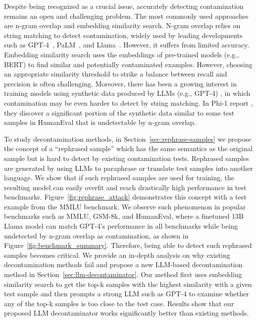 Despite being recognized as a crucial issue, accurately detecting contamination remains an open and challenging problem.
The most commonly used approaches are n-gram overlap and embedding similarity search.
N-gram overlap relies on string matching to detect contamination, widely used by leading developments such as GPT-4~\citep{openai2023gpt4}, PaLM~\citep{anil2023palm}, and Llama~\citep{touvron2023llama}. However, it suffers from limited accuracy.
Embedding similarity search uses the embeddings of pre-trained models (e.g., BERT) to find similar and potentially contaminated examples.
However, choosing an appropriate similarity threshold to strike a balance between recall and precision is often challenging.
Moreover, there has been a growing interest in training models using synthetic data produced by LLMs (e.g., GPT-4) \citep{gunasekar2023textbooks, alpaca, wang2023selfinstruct, xu2023wizardlm, mukherjee2023orca}, in which contamination may be even harder to detect by string matching.
In Phi-1 report \citep{gunasekar2023textbooks}, they discover a significant portion of the synthetic data similar to some test samples in HumanEval that is undetectable by n-gram overlap.

To study decontamination methods, in Section~\ref{sec:rephrase-samples} we propose the concept of a ``rephrased sample'' which has the same semantics as the original sample but is hard to detect by existing contamination tests.
Rephrased samples are generated by using LLMs to paraphrase or translate test samples into another language.
We show that if such rephrased samples are used for training, the resulting model can easily overfit and reach drastically high performance in test benchmarks.
Figure~\ref{fig:rephrase_attack} demonstrates this concept with a test example from the MMLU benchmark.
We observe such phenomenon in popular benchmarks such as MMLU, GSM-8k, and HumanEval, where a finetuned 13B Llama model can match GPT-4's performance in all benchmarks while being undetected by n-gram overlap as contamination, as shown in Figure~\ref{fig:benchmark_summary}.
Therefore, being able to detect such rephrased samples becomes critical. We provide an in-depth analysis on why existing decontamination methods fail and propose a new LLM-based decontamination method in Section~\ref{sec:llm-decontaminator}. Our method first uses embedding similarity search to get the top-k samples with the highest similarity with a given test sample and then prompts a strong LLM such as GPT-4 to examine whether any of the top-k samples is too close to the test case.
Results show that our proposed LLM decontaminator works significantly better than existing methods.

